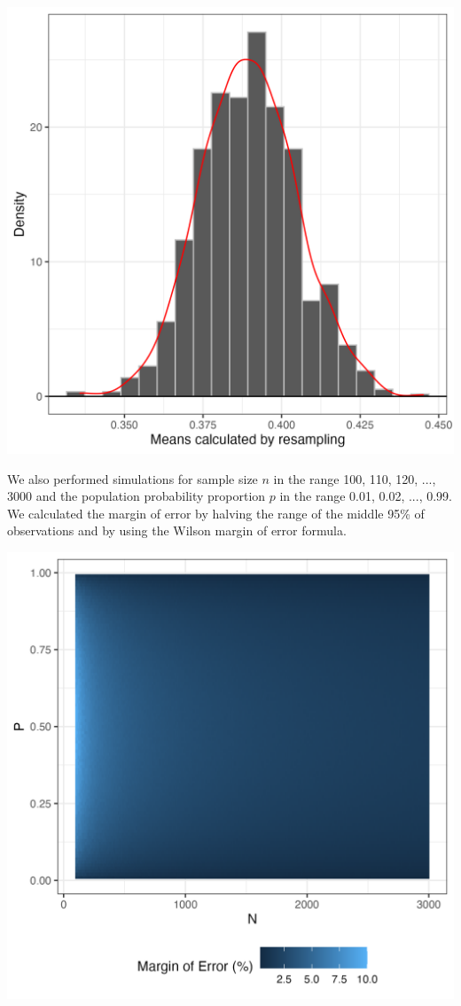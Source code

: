 \documentclass{article}\usepackage[]{graphicx}\usepackage[]{xcolor}
\newenvironment{Figure}
  {\par\medskip\noindent\minipage{\linewidth}}
  {\endminipage\par\medskip}
\begin{document}
\begin{multicols}{2}
\begin{Figure}
 \centering
 \includegraphics[width = 0.7\linewidth]{resample.png}
 \label{fig:res}
\end{Figure}

We also performed simulations for sample size $n$ in the range {100, 110, 120, ..., 3000} and the population probability proportion $p$ in the range {0.01, 0.02, ..., 0.99}. We calculated the margin of error by halving the range of the middle 95\% of observations and by using the Wilson margin of error formula.

\begin{Figure}
 \centering
 \includegraphics[width =0.7\linewidth]{error.png}
 \label{fig:err}
\end{Figure}


\end{multicols}
\end{document}
